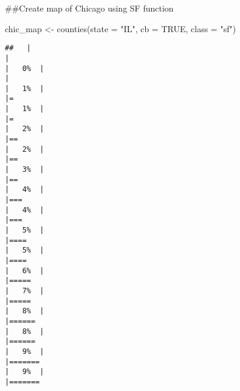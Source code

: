 \documentclass[
]{article}
\newenvironment{Shaded}{\begin{snugshade}}{\end{snugshade}}
\newcommand{\AttributeTok}[1]{\textcolor[rgb]{0.77,0.63,0.00}{#1}}
\newcommand{\ConstantTok}[1]{\textcolor[rgb]{0.00,0.00,0.00}{#1}}
\newcommand{\FunctionTok}[1]{\textcolor[rgb]{0.00,0.00,0.00}{#1}}
\newcommand{\NormalTok}[1]{#1}
\newcommand{\OtherTok}[1]{\textcolor[rgb]{0.56,0.35,0.01}{#1}}
\newcommand{\StringTok}[1]{\textcolor[rgb]{0.31,0.60,0.02}{#1}}
\begin{document}
\#\#Create map of Chicago using SF function

\begin{Shaded}
\begin{Highlighting}[]
\NormalTok{chic\_map }\OtherTok{\textless{}{-}} \FunctionTok{counties}\NormalTok{(}\AttributeTok{state =} \StringTok{"IL"}\NormalTok{, }\AttributeTok{cb =} \ConstantTok{TRUE}\NormalTok{, }\AttributeTok{class =} \StringTok{"sf"}\NormalTok{)}
\end{Highlighting}
\end{Shaded}

\begin{verbatim}
##   |                                                                              |                                                                      |   0%  |                                                                              |                                                                      |   1%  |                                                                              |=                                                                     |   1%  |                                                                              |=                                                                     |   2%  |                                                                              |==                                                                    |   2%  |                                                                              |==                                                                    |   3%  |                                                                              |==                                                                    |   4%  |                                                                              |===                                                                   |   4%  |                                                                              |===                                                                   |   5%  |                                                                              |====                                                                  |   5%  |                                                                              |====                                                                  |   6%  |                                                                              |=====                                                                 |   7%  |                                                                              |=====                                                                 |   8%  |                                                                              |======                                                                |   8%  |                                                                              |======                                                                |   9%  |                                                                              |=======                                                               |   9%  |                                                                              |=======    
\end{verbatim}
\end{document}
